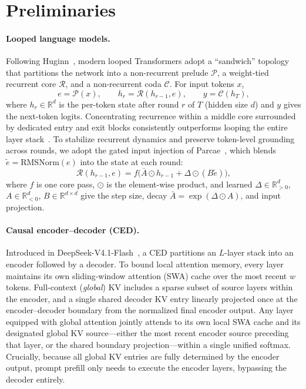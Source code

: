 \section{Preliminaries}
\label{sec:background}

\paragraph{Looped language models.} Following Huginn~\citep{huginn}, modern looped Transformers adopt a ``sandwich'' topology that partitions the network into a non-recurrent prelude $\mathcal{P}$, a weight-tied recurrent core $\mathcal{R}$, and a non-recurrent coda $\mathcal{C}$. For input tokens $x$,
\begin{equation}
  e = \mathcal{P}(x), \qquad h_r = \mathcal{R}(h_{r-1}, e), \qquad y = \mathcal{C}(h_T),
  \label{eq:sandwich}
\end{equation}
where $h_r \in \mathbb{R}^d$ is the per-token state after round $r$ of $T$ (hidden size $d$) and $y$ gives the next-token logits. Concentrating recurrence within a middle core surrounded by dedicated entry and exit blocks consistently outperforms looping the entire layer stack~\citep{saunshi_looped,loopsright1}. To stabilize recurrent dynamics and preserve token-level grounding across rounds, we adopt the gated input injection of Parcae~\citep{parcae}, which blends $\tilde{e} = \mathrm{RMSNorm}(e)$ into the state at each round:
\begin{equation}
  \mathcal{R}(h_{r-1}, e) = f\big(\bar{A} \odot h_{r-1} + \Delta \odot (B\tilde{e})\big),
  \label{eq:injection}
\end{equation}
where $f$ is one core pass, $\odot$ is the element-wise product, and learned $\Delta \in \mathbb{R}^d_{>0}$, $A \in \mathbb{R}^d_{<0}$, $B \in \mathbb{R}^{d \times d}$ give the step size, decay $\bar{A} = \exp(\Delta \odot A)$, and input projection.

\paragraph{Causal encoder--decoder (CED).} Introduced in DeepSeek-V4.1-Flash~\citep{deepseekv41}, a CED partitions an $L$-layer stack into an encoder followed by a decoder. To bound local attention memory, every layer maintains its own sliding-window attention (SWA) cache over the most recent $w$ tokens. Full-context (\emph{global}) KV includes a sparse subset of source layers within the encoder, and a single shared decoder KV entry linearly projected once at the encoder--decoder boundary from the normalized final encoder output. Any layer equipped with global attention jointly attends to its own local SWA cache and its designated global KV source—either the most recent encoder source preceding that layer, or the shared boundary projection—within a single unified softmax. Crucially, because all global KV entries are fully determined by the encoder output, prompt prefill only needs to execute the encoder layers, bypassing the decoder entirely.
